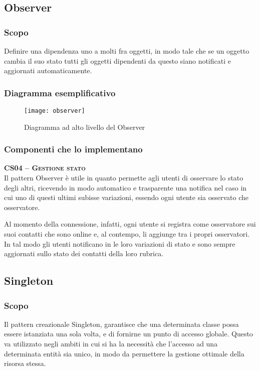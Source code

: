 \subsection{Observer}

\subsubsection{Scopo}
Definire una dipendenza uno a molti fra oggetti, in modo tale che se un oggetto cambia il suo stato tutti gli oggetti dipendenti da questo siano notificati e aggiornati automaticamente.

\subsubsection{Diagramma esemplificativo}
\begin{figure}[H]
  \centering
  \texttt{[image: observer]}
  \caption{Diagramma ad alto livello del  Observer}\label{fig:observer}
\end{figure}

\subsubsection{Componenti che lo implementano}
\begin{description}
  \item{\scshape\bfseries CS04 -- Gestione stato}\\
Il pattern Observer è utile in quanto permette agli utenti di osservare lo stato degli altri, ricevendo in modo automatico e trasparente una notifica nel caso in cui uno di questi ultimi subisse variazioni, essendo ogni utente sia osservato che osservatore.

Al momento della connessione, infatti, ogni utente si registra come osservatore sui suoi contatti che sono online e, al contempo, li aggiunge tra i propri osservatori. In tal modo gli utenti notificano in  le loro variazioni di stato e sono sempre aggiornati sullo stato dei contatti della loro rubrica.
\end{description}

\subsection{Singleton}

\subsubsection{Scopo}
Il pattern creazionale Singleton, garantisce che una determinata classe possa essere istanziata una sola volta, e di fornirne un punto di accesso globale. Questo  va utilizzato negli ambiti in cui si ha la necessità che l'accesso ad una determinata entità sia unico, in modo da permettere la gestione ottimale della risorsa stessa.

